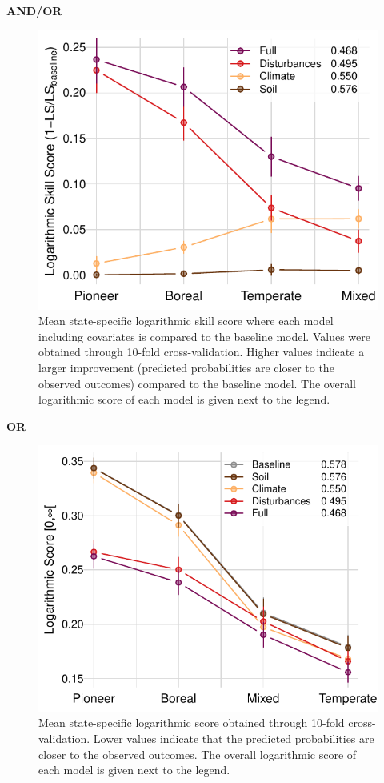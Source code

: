 \documentclass[a4paperpaper,]{article}
\begin{document}
\textbf{AND/OR}

\begin{figure}
\centering
\includegraphics{res/fig3_cv_LSS.pdf}
\caption{Mean state-specific logarithmic skill score where each model
including covariates is compared to the baseline model. Values were
obtained through 10-fold cross-validation. Higher values indicate a
larger improvement (predicted probabilities are closer to the observed
outcomes) compared to the baseline model. The overall logarithmic score
of each model is given next to the legend.}
\end{figure}

\textbf{OR}

\begin{figure}
\centering
\includegraphics{res/fig3_cv_LS.pdf}
\caption{Mean state-specific logarithmic score obtained through 10-fold
cross-validation. Lower values indicate that the predicted probabilities
are closer to the observed outcomes. The overall logarithmic score of
each model is given next to the legend.}
\end{figure}
\end{document}
